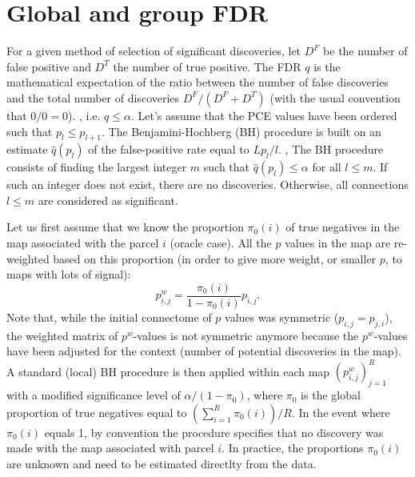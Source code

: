 \documentclass[authoryear,preprint,review]{elsarticle}
\begin{document}
\section{Global and group FDR}
\label{app_fdr}
For a given method of selection of significant discoveries, let $D^F$ be the number of false positive and $D^T$ the number of true positive. The FDR $q$ is the mathematical expectation of the ratio between the number of false discoveries and the total number of discoveries $D^F/(D^F + D^T)$ (with the usual convention that $0/0=0$). , i.e. $q\leq \alpha$. Let's assume that the PCE values have been ordered such that $p_{l}\leq p_{l+1}$. The Benjamini-Hochberg (BH) procedure is built on an estimate $\hat{q}(p_l)$ of the false-positive rate equal to $Lp_l/l$. , The BH procedure consists of finding the largest integer $m$ such that $\hat{q}(p_{l})\leq \alpha$ for all $l\leq m$. If such an integer does not exist, there are no discoveries. Otherwise, all connections $l\leq m$ are considered as significant. 
\par
Let us first assume that we know the proportion $\pi_0(i)$ of true negatives in the map associated with the parcel $i$ (oracle case). All the $p$ values in the map are re-weighted based on this proportion (in order to give more weight, or smaller 
$p$, to maps with lots of signal):
\begin{equation}
 \label{eq_weight_GBH}
 p^w_{i,j} = \frac{\pi_0(i)}{1-\pi_0(i)}p_{i,j}.
\end{equation}
Note that, while the initial connectome of $p$ values was symmetric ($p_{i,j} = p_{j,i}$), the weighted matrix of $p^w$-values is not symmetric anymore because the $p^w$-values have been adjusted for the context (number of potential discoveries in the map). A standard (local) BH procedure is then applied within each map $(p^w_{i,j})_{j=1}^R$ with a modified significance level of $\alpha/(1-\pi_0)$, where $\pi_0$ is the global proportion of true negatives equal to $(\sum_{i=1}^R \pi_0(i) )/R$. In the event where $\pi_0(i)$ equals 1, by convention the procedure specifies that no discovery was made with the map associated with parcel $i$. In practice, the proportions $\pi_0(i)$ are unknown and need to be estimated directlty from the data. 
\end{document}
